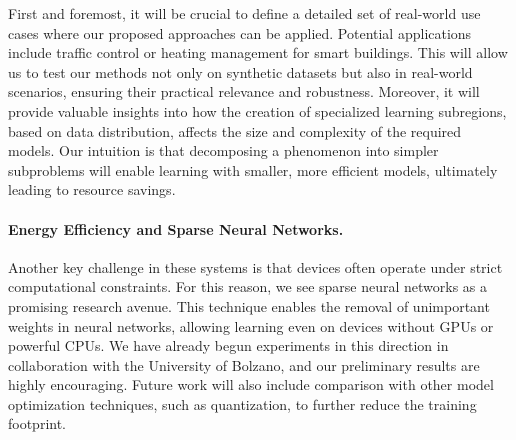 \documentclass[runningheads]{llncs}
\begin{document}
First and foremost, it will be crucial to define a detailed set of real-world use cases where our proposed approaches can be applied. 
%
Potential applications include traffic control or heating management for smart buildings. 
%
This will allow us to test our methods not only on synthetic datasets but also in real-world scenarios, 
 ensuring their practical relevance and robustness. 
% 
Moreover, it will provide valuable insights into how the creation of specialized learning subregions, based on data distribution, 
 affects the size and complexity of the required models. 
% 
Our intuition is that decomposing a phenomenon into simpler subproblems will enable learning with smaller, more efficient models, 
 ultimately leading to resource savings.

\paragraph{Energy Efficiency and Sparse Neural Networks.}
Another key challenge in these systems is that devices often operate under strict computational constraints. 
%
For this reason, we see sparse neural networks as a promising research avenue. 
%
This technique enables the removal of unimportant weights in neural networks, allowing learning even on devices without 
 GPUs or powerful CPUs. 
% 
We have already begun experiments in this direction in collaboration with the University of Bolzano, 
 and our preliminary results are highly encouraging. 
% 
Future work will also include comparison with other model optimization techniques, such as quantization, 
 to further reduce the training footprint.
\end{document}
